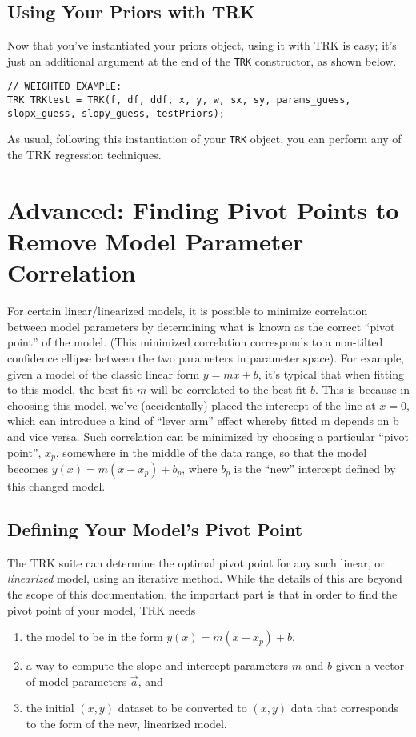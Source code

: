 \documentclass[12pt]{article}
\newcommand{\li}{\lstinline}
\begin{document}
\subsection{Using Your Priors with TRK}
\par Now that you've instantiated your priors object, using it with TRK is easy; it's just an additional argument at the end of the \li{TRK} constructor, as shown below.
\begin{lstlisting}
// WEIGHTED EXAMPLE:
TRK TRKtest = TRK(f, df, ddf, x, y, w, sx, sy, params_guess, slopx_guess, slopy_guess, testPriors);
\end{lstlisting}
As usual, following this instantiation of your \li{TRK} object, you can perform any of the TRK regression techniques.

\section{Advanced: Finding Pivot Points to Remove Model Parameter Correlation}

For certain linear/linearized models, it is possible to minimize correlation between model parameters by determining what is known as the correct ``pivot point'' of the model. (This minimized correlation corresponds to a non-tilted confidence ellipse between the two parameters in parameter space). For example, given a model of the classic linear form $y=mx + b$, it's typical that when fitting to this model, the best-fit $m$ will be correlated to the best-fit $b$. This is because in choosing this model, we've (accidentally) placed the intercept of the line at $x=0$, which can introduce a kind of ``lever arm'' effect whereby fitted m depends on b and vice versa. Such correlation can be minimized by choosing a particular ``pivot point'', $x_p$, somewhere in the middle of the data range, so that the model becomes $y(x) = m(x - x_p) + b_p$, where $b_p$ is the ``new'' intercept defined by this changed model.

\subsection{Defining Your Model's Pivot Point}

The TRK suite can determine the optimal pivot point for any such linear, or \textit{linearized} model, using an iterative method. While the details of this are beyond the scope of this documentation, the important part is that in order to find the pivot point of your model, TRK needs
\begin{enumerate}
    \item the model to be in the form $y(x) = m(x - x_p) + b$,
    \item a way to compute the slope and intercept parameters $m$ and $b$ given a vector of model parameters $\vec{a}$, and
    \item the initial $(x,y)$ dataset to be converted to $(x,y)$ data that corresponds to the form of the new, linearized model. 
\end{enumerate}
\end{document}
